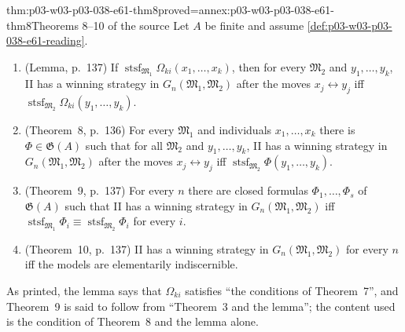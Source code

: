 \begin{hbtheorem}{thm:p03-w03-p03-038-e61-thm8}{proved=annex:p03-w03-p03-038-e61-thm8}{Theorems 8--10 of the source}
Let \(A\) be finite and assume \cref{def:p03-w03-p03-038-e61-reading}.
\begin{enumerate}
\item (Lemma, p.~137) If
      \(\operatorname{stsf}_{\mathfrak M_1}\Omega_{ki}(x_1,\ldots,x_k)\), then
      for every \(\mathfrak M_2\) and \(y_1,\ldots,y_k\), II has a winning
      strategy in \(G_n(\mathfrak M_1,\mathfrak M_2)\) after the moves
      \(x_j\leftrightarrow y_j\) iff
      \(\operatorname{stsf}_{\mathfrak M_2}\Omega_{ki}(y_1,\ldots,y_k)\).
\item (Theorem~8, p.~136) For every \(\mathfrak M_1\) and individuals
      \(x_1,\ldots,x_k\) there is \(\Phi\in\mathfrak G(A)\) such that for all
      \(\mathfrak M_2\) and \(y_1,\ldots,y_k\), II has a winning strategy in
      \(G_n(\mathfrak M_1,\mathfrak M_2)\) after the moves
      \(x_j\leftrightarrow y_j\) iff
      \(\operatorname{stsf}_{\mathfrak M_2}\Phi(y_1,\ldots,y_k)\).
\item (Theorem~9, p.~137) For every \(n\) there are closed formulas
      \(\Phi_1,\ldots,\Phi_s\) of \(\mathfrak G(A)\) such that II has a
      winning strategy in \(G_n(\mathfrak M_1,\mathfrak M_2)\) iff
      \(\operatorname{stsf}_{\mathfrak M_1}\Phi_i\equiv
      \operatorname{stsf}_{\mathfrak M_2}\Phi_i\) for every \(i\).
\item (Theorem~10, p.~137) II has a winning strategy in
      \(G_n(\mathfrak M_1,\mathfrak M_2)\) for every \(n\) iff the models are
      elementarily indiscernible.
\end{enumerate}
\end{hbtheorem}

As printed, the lemma says that \(\Omega_{ki}\) satisfies ``the conditions
of Theorem~7'', and Theorem~9 is said to follow from ``Theorem~3 and the
lemma''; the content used is the condition of Theorem~8 and the lemma alone.

